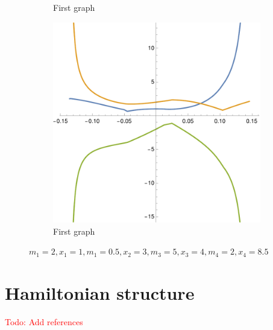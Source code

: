 \documentclass[english,master]{liumaiex}
\theoremstyle{plain}
\theoremstyle{definition}
\newcommand\todo[1]{\textcolor{red}{#1}}
\begin{document}
\begin{figure}[H]
\begin{subfigure}{0.3\textwidth}
        \caption{First graph}
    \end{subfigure}
	\hfill
	\begin{subfigure}{0.3\textwidth}
        \includegraphics[width=\textwidth]{graphs/perCollision/m.pdf}
        \caption{First graph}
    \end{subfigure}
    \caption{$m_1 = 2, x_1 = 1, m_1 = 0.5, x_2 = 3, m_3 = 5, x_3 = 4, m_4 = 2, x_4 = 8.5$}
\end{figure}


\section{Hamiltonian structure}


\todo{Todo: Add references}
\end{document}
